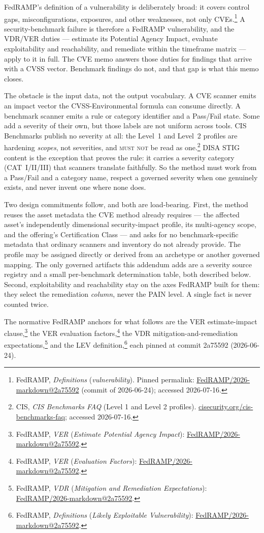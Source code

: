 \documentclass[11pt]{article}
\makeatletter
\newcommand{\rfckw}[1]{\textsc{#1}}
\newcommand{\fedbase}{https://github.com/FedRAMP/2026-markdown/blob/2a75592f0e1f86a48b2888d29af6c570c419a7a5}
\newcommand{\defvulncite}{\href{\fedbase/definitions.md\#vulnerability}{FedRAMP/2026-markdown@2a75592}}
\newcommand{\deflevcite}{\href{\fedbase/definitions.md\#likely-exploitable-vulnerability-lev}{FedRAMP/2026-markdown@2a75592}}
\newcommand{\verpaincite}{\href{\fedbase/providers/rev5/rules/vulnerability-evaluation-and-reporting.md\#estimate-potential-agency-impact}{FedRAMP/2026-markdown@2a75592}}
\newcommand{\verfactcite}{\href{\fedbase/providers/rev5/rules/vulnerability-evaluation-and-reporting.md\#evaluation-factors}{FedRAMP/2026-markdown@2a75592}}
\newcommand{\vdrmitcite}{\href{\fedbase/providers/rev5/rules/vulnerability-detection-and-response.md\#mitigation-and-remediation-expectations}{FedRAMP/2026-markdown@2a75592}}
\newcommand{\ciscite}{\href{https://www.cisecurity.org/cis-benchmarks/cis-benchmarks-faq}{cisecurity.org/cis-benchmarks-faq}}
\makeatother
\begin{document}
FedRAMP's definition of a vulnerability is deliberately broad: it covers control
gaps, misconfigurations, exposures, and other weaknesses, not only
CVEs.\footnote{FedRAMP, \emph{Definitions} (\emph{vulnerability}). Pinned permalink:
\defvulncite{} (commit of 2026-06-24); accessed 2026-07-16.} A security-benchmark
failure is therefore a FedRAMP vulnerability, and the VDR/VER duties --- estimate
its Potential Agency Impact, evaluate exploitability and reachability, and remediate
within the timeframe matrix --- apply to it in full. The CVE memo answers those
duties for findings that arrive with a CVSS vector. Benchmark findings do not, and
that gap is what this memo closes.

The obstacle is the input data, not the output vocabulary. A CVE scanner emits an
impact vector the CVSS-Environmental formula can consume directly. A benchmark
scanner emits a rule or category identifier and a Pass/Fail state. Some add a
severity of their own, but those labels are not uniform across tools. CIS Benchmarks
publish no severity at all: the Level~1 and Level~2 profiles are hardening
\emph{scopes}, not severities, and \rfckw{must not} be read as one.\footnote{CIS,
\emph{CIS Benchmarks FAQ} (Level 1 and Level 2 profiles). \ciscite{}; accessed
2026-07-16.} DISA STIG content is the exception that proves the rule: it carries a
severity category (CAT~I/II/III) that scanners translate faithfully. So the method
must work from a Pass/Fail and a category name, respect a governed severity when one
genuinely exists, and never invent one where none does.

Two design commitments follow, and both are load-bearing. First, the method reuses
the asset metadata the CVE method already requires --- the affected asset's
independently dimensional security-impact profile, its multi-agency scope, and the
offering's Certification Class --- and asks for no benchmark-specific metadata that
ordinary scanners and inventory do not already provide. The profile may be assigned
directly or derived from an archetype or another governed mapping. The only
governed artifacts this addendum adds
are a severity source registry and a small per-benchmark determination table, both
described below. Second, exploitability and reachability stay on the axes FedRAMP
built for them: they select the remediation \emph{column}, never the PAIN level. A
single fact is never counted twice.

The normative FedRAMP anchors for what follows are the VER estimate-impact
clause,\footnote{FedRAMP, \emph{VER} (\emph{Estimate Potential Agency Impact}):
\verpaincite{}.} the VER evaluation factors,\footnote{FedRAMP, \emph{VER}
(\emph{Evaluation Factors}): \verfactcite{}.} the VDR mitigation-and-remediation
expectations,\footnote{FedRAMP, \emph{VDR} (\emph{Mitigation and Remediation
Expectations}): \vdrmitcite{}.} and the LEV definition,\footnote{FedRAMP,
\emph{Definitions} (\emph{Likely Exploitable Vulnerability}): \deflevcite{}.} each
pinned at commit 2a75592 (2026-06-24).
\end{document}
